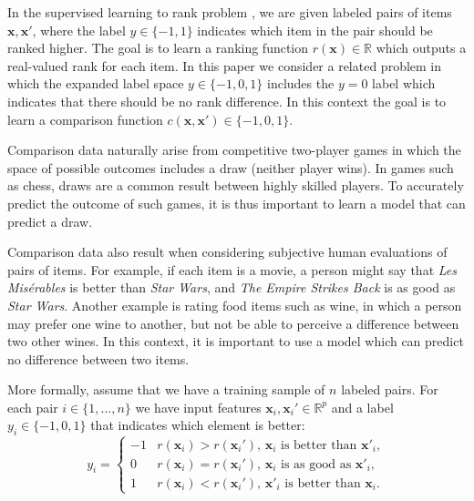 \documentclass[twoside,11pt]{article}
\newcommand{\RR}{\mathbb R}
\begin{document}
In the supervised learning to rank problem \citep{learning-to-rank}, we are
given labeled pairs of items $\mathbf x,\mathbf x'$, where the label
$y\in\{-1,1\}$ indicates which item in the pair should be ranked
higher. The goal is to learn a ranking function $r(\mathbf x)\in\RR$
which outputs a real-valued rank for each item. In this paper we
consider a related problem in which the expanded label space
$y\in\{-1,0,1\}$ includes the $y=0$ label which indicates that there
should be no rank difference. In this context the goal is to learn a
comparison function $c(\mathbf x, \mathbf x')\in\{-1,0,1\}$.

Comparison data naturally arise from competitive two-player games in which
the space of possible outcomes includes a draw (neither player wins).
In games such as chess, draws are a common result between highly
skilled players. To accurately predict the outcome of such games, it
is thus important to learn a model that can predict a draw. 

Comparison data also result when considering subjective human
evaluations of pairs of items. For example, if each item is a movie, a
person might say that \textit{Les Mis\'erables} is better than
\textit{Star Wars}, and \textit{The Empire Strikes Back} is as good as
\textit{Star Wars}. Another example is rating food items such as
wine, in which a person may prefer one wine to another, but not be
able to perceive a difference between two other wines. In this
context, it is important to use a model which can predict no
difference between two items.

More formally, assume
that we have a training sample of $n$ labeled pairs. For each pair
$i\in\{1,\dots,n\}$ we have input features $\mathbf x_i,\mathbf
x_i'\in\RR^p$ and a label $y_i\in\{-1,0,1\}$ that indicates which
element is better:
\begin{equation}
  \label{eq:z}
  y_i =
  \begin{cases}
    -1 &  r(\mathbf x_i)>r(\mathbf x_i')
    \text{, $\mathbf x_i$ is better than $\mathbf x'_i$},\\
    0 & r(\mathbf x_i) = r(\mathbf x_i')
    \text{, $\mathbf x_i$ is as good as $\mathbf x'_i$},\\
    1 & r(\mathbf x_i)<r(\mathbf x_i')
    \text{, $\mathbf x'_i$ is better than $\mathbf x_i$}.
  \end{cases}
\end{equation}
\end{document}
